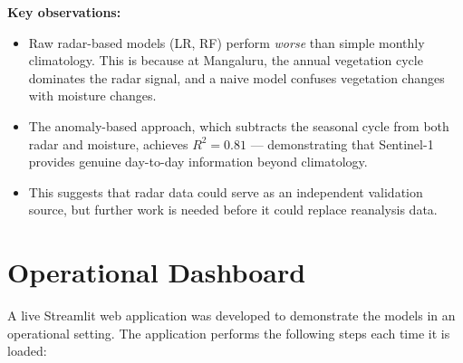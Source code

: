\documentclass[12pt, a4paper]{article}
\begin{document}
\textbf{Key observations:}
\begin{itemize}
    \item Raw radar-based models (LR, RF) perform \textit{worse} than simple monthly climatology. This is because at Mangaluru, the annual vegetation cycle dominates the radar signal, and a naive model confuses vegetation changes with moisture changes.
    \item The anomaly-based approach, which subtracts the seasonal cycle from both radar and moisture, achieves $R^2 = 0.81$ --- demonstrating that Sentinel-1 provides genuine day-to-day information beyond climatology.
    \item This suggests that radar data could serve as an independent validation source, but further work is needed before it could replace reanalysis data.
\end{itemize}


\section{Operational Dashboard}

A live Streamlit web application was developed to demonstrate the models in an operational setting. The application performs the following steps each time it is loaded:
\end{document}
